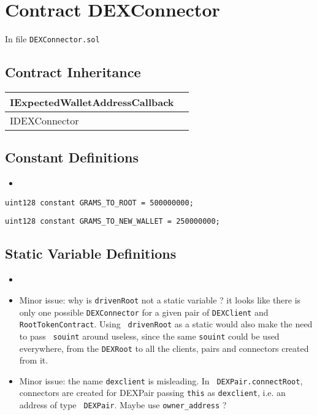 
\chapter{Contract DEXConnector}


In file {\tt DEXConnector.sol}

\section{Contract Inheritance}


\noindent\begin{tabular}{|l|p{5cm}|}\hline
IExpectedWalletAddressCallback & \\\hline
IDEXConnector & \\\hline
\end{tabular}


\section{Constant Definitions}

\begin{itemize}
\item \issueUnits{}
\end{itemize}

\begin{lstlisting}[firstnumber=19]
  uint128 constant GRAMS_TO_ROOT = 500000000;
\end{lstlisting}

\begin{lstlisting}[firstnumber=20]
  uint128 constant GRAMS_TO_NEW_WALLET = 250000000;
\end{lstlisting}

\section{Static Variable Definitions}

\begin{itemize}
\item \issueStatic{}
\item Minor issue: why is {\tt drivenRoot} not a static variable ? it
  looks like there is only one possible {\tt DEXConnector} for a given
  pair of {\tt DEXClient} and {\tt RootTokenContract}. Using {\tt
    drivenRoot} as a static would also make the need to pass {\tt
    souint} around useless, since the same {\tt souint} could be used
  everywhere, from the {\tt DEXRoot} to all the clients, pairs and
  connectors created from it.
\item Minor issue: the name {\tt dexclient} is misleading. In {\tt
  DEXPair.connectRoot}, connectors are created for DEXPair passing
  {\tt this} as {\tt dexclient}, i.e. an address of type {\tt
    DEXPair}. Maybe use {\tt owner\_address} ?
\end{itemize}


